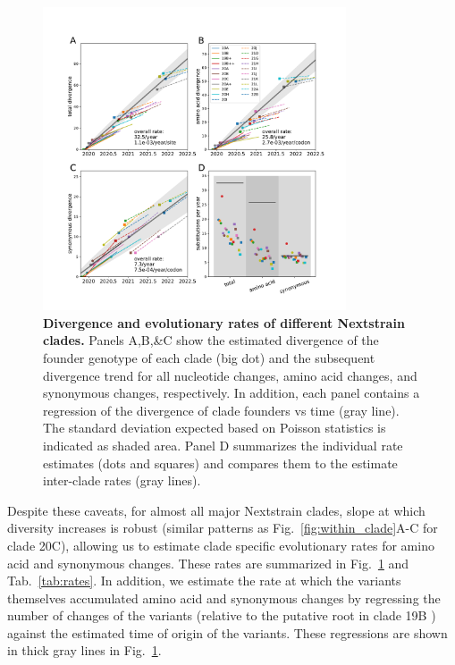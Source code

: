 \documentclass[aps,rmp, twocolumn]{revtex4}
\begin{document}
\begin{figure}
    \includegraphics[width=0.8\textwidth]{figures/rate_summary.pdf}
    \caption[]{{\bf Divergence and evolutionary rates of different Nextstrain clades.} Panels A,B,\&C show the estimated divergence of the founder genotype of each clade (big dot) and the subsequent divergence trend for all nucleotide changes, amino acid changes, and synonymous changes, respectively. In addition, each panel contains a regression of the divergence of clade founders vs time (gray line).
    The standard deviation expected based on Poisson statistics is indicated as shaded area.
    Panel D summarizes the individual rate estimates (dots and squares) and compares them to the estimate inter-clade rates (gray lines).
    \label{fig:rate_summary} }
\end{figure}

Despite these caveats, for almost all major Nextstrain clades, slope at which diversity increases is robust (similar patterns as Fig.~\ref{fig:within_clade}A-C for clade 20C), allowing us to estimate clade specific evolutionary rates for amino acid and synonymous changes.
These rates are summarized in Fig.~\ref{fig:rate_summary} and Tab.~\ref{tab:rates}.
In addition, we estimate the rate at which the variants themselves accumulated amino acid and synonymous changes by regressing the number of changes of the variants (relative to the putative root in clade 19B \citep{caraballo-ortiz_tophap_2022}) against the estimated time of origin of the variants.
These regressions are shown in thick gray lines in Fig.~\ref{fig:rate_summary}.
\end{document}

